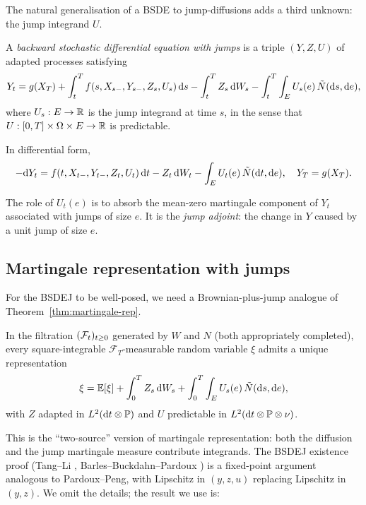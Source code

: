 The natural generalisation of a BSDE to jump-diffusions adds a third unknown: the jump integrand $U$.

\begin{definition}[BSDEJ]
\label{def:bsdej}
A \emph{backward stochastic differential equation with jumps} is a triple $(Y, Z, U)$ of adapted processes satisfying
\begin{equation}
  Y_t = g(X_T) + \int_t^T f(s, X_{s-}, Y_{s-}, Z_s, U_s) \, \mathrm{d} s - \int_t^T Z_s \, \mathrm{d} W_s - \int_t^T \int_E U_s(e) \, \tilde N(\mathrm{d} s, \mathrm{d} e),
  \label{eq:bsdej-integral}
\end{equation}
where $U_s : E \to \mathbb{R}$ is the jump integrand at time $s$, in the sense that $U : [0, T] \times \Omega \times E \to \mathbb{R}$ is predictable.
\end{definition}

In differential form,
\begin{equation}
  -\mathrm{d} Y_t = f(t, X_{t-}, Y_{t-}, Z_t, U_t) \, \mathrm{d} t - Z_t \, \mathrm{d} W_t - \int_E U_t(e)\, \tilde N(\mathrm{d} t, \mathrm{d} e), \quad Y_T = g(X_T).
\end{equation}

The role of $U_t(e)$ is to absorb the mean-zero martingale component of $Y_t$ associated with jumps of size $e$. It is the \emph{jump adjoint}: the change in $Y$ caused by a unit jump of size $e$.

\subsection{Martingale representation with jumps}

For the BSDEJ to be well-posed, we need a Brownian-plus-jump analogue of Theorem~\ref{thm:martingale-rep}.

\begin{theorem}
\label{thm:jacod-yor}
In the filtration $(\mathcal{F}_t)_{t \geq 0}$ generated by $W$ and $N$ (both appropriately completed), every square-integrable $\mathcal{F}_T$-measurable random variable $\xi$ admits a unique representation
\begin{equation}
  \xi = \mathbb{E}[\xi] + \int_0^T Z_s \, \mathrm{d} W_s + \int_0^T \int_E U_s(e) \, \tilde N(\mathrm{d} s, \mathrm{d} e),
\end{equation}
with $Z$ adapted in $L^2(\mathrm{d} t \otimes \mathbb{P})$ and $U$ predictable in $L^2(\mathrm{d} t \otimes \mathbb{P} \otimes \nu)$.
\end{theorem}

This is the ``two-source'' version of martingale representation: both the diffusion and the jump martingale measure contribute integrands. The BSDEJ existence proof (Tang--Li \cite{tang1994}, Barles--Buckdahn--Pardoux \cite{barles1997}) is a fixed-point argument analogous to Pardoux--Peng, with Lipschitz in $(y, z, u)$ replacing Lipschitz in $(y, z)$. We omit the details; the result we use is:

